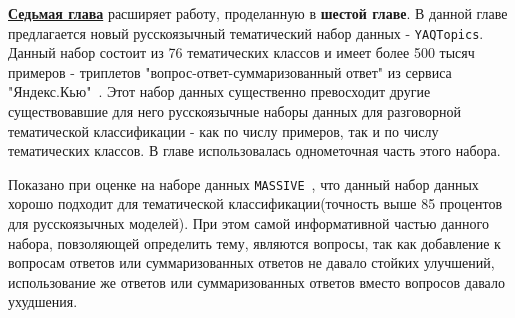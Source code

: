 \underline{\textbf{Седьмая глава}} расширяет работу, проделанную в \textbf{шестой главе}. В данной главе предлагается новый русскоязычный тематический набор данных - \texttt{YAQTopics}.  Данный набор состоит из 76 тематических классов и имеет более 500 тысяч примеров - триплетов "вопрос-ответ-суммаризованный ответ" из сервиса "Яндекс.Кью"~\cite{yandex_q}. Этот набор данных существенно превосходит другие существовавшие для него русскоязычные наборы данных для разговорной тематической классификации - как по числу примеров, так и по числу тематических классов. В главе использовалась однометочная часть этого набора. 

\begin{table}[t]
\centering
{}
\caption{Размеры набора данных \texttt{YAQTopics} по классу и разбиению}
\label{tab:rutopics:sizes2}
\end{table}


Показано при оценке на наборе данных \texttt{MASSIVE}~\cite{massive}, что данный набор данных хорошо подходит для тематической классификации(точность выше 85 процентов для русскоязычных моделей). При этом самой информативной частью данного набора, повзоляющей определить тему, являются вопросы, так как добавление к вопросам ответов или суммаризованных ответов не давало стойких улучшений, использование же ответов или суммаризованных ответов вместо вопросов давало ухудшения.



